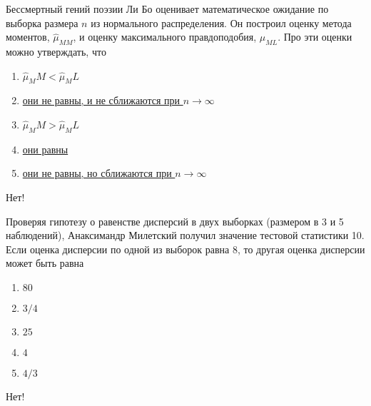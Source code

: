 \documentclass[t]{beamer}
\begin{document}
 \begin{frame} \label{22-No} 
\begin{block}{22} 

Бессмертный гений поэзии Ли Бо оценивает математическое ожидание  по выборка размера $n$ из нормального распределения. Он построил оценку метода моментов, $\hat{\mu}_{MM}$, и оценку максимального правдоподобия, $\hat{\mu}_{ML}$. Про эти оценки можно утверждать, что
 


 \end{block} 
\begin{enumerate} 
\item[] \hyperlink{22-No}{\beamergotobutton{} $\hat\mu_MM<\hat\mu_ML$ }
\item[] \hyperlink{22-No}{\beamergotobutton{} они не равны, и не сближаются при $n\to \infty$}
\item[] \hyperlink{22-No}{\beamergotobutton{} $\hat\mu_MM>\hat\mu_ML$}
\item[] \hyperlink{22-Yes}{\beamergotobutton{} они равны}
\item[] \hyperlink{22-No}{\beamergotobutton{} они не равны, но сближаются при $n\to \infty$}
\end{enumerate} 

 \alert{Нет!} 
\end{frame} 


 \begin{frame} \label{23-No} 
\begin{block}{23} 

Проверяя гипотезу о равенстве дисперсий в двух выборках (размером в 3 и 5 наблюдений), Анаксимандр Милетский получил значение тестовой статистики 10. Если оценка дисперсии по одной из выборок равна 8, то другая оценка дисперсии может быть равна
 


 \end{block} 
\begin{enumerate} 
\item[] \hyperlink{23-Yes}{\beamergotobutton{} $80$}
\item[] \hyperlink{23-No}{\beamergotobutton{} $3/4$}
\item[] \hyperlink{23-No}{\beamergotobutton{} $25$}
\item[] \hyperlink{23-No}{\beamergotobutton{} $4$}
\item[] \hyperlink{23-No}{\beamergotobutton{} $4/3$}
\end{enumerate} 

 \alert{Нет!} 
\end{frame} 
\end{document}
